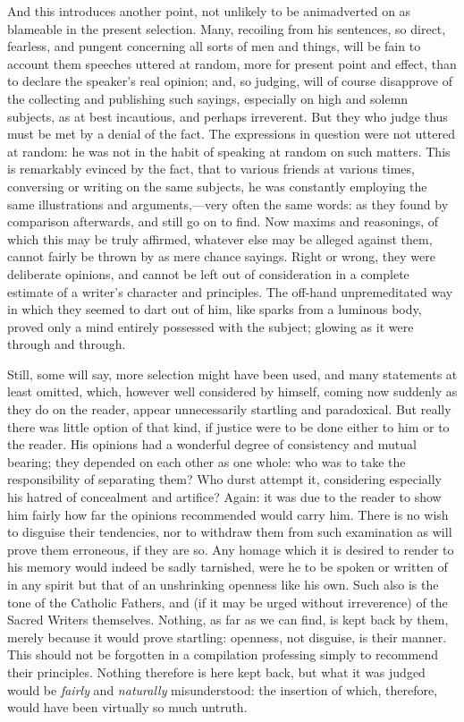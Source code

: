 And this introduces another
point, not unlikely to be animadverted on as blameable in the present
selection. Many, recoiling from his sentences, so direct, fearless,
and pungent concerning all sorts of men and things, will be fain to
account them speeches uttered at random, more for present point and
effect, than to declare the speaker's real opinion; and, so judging,
will of course disapprove of the collecting and publishing such
sayings, especially on high and solemn subjects, as at best
incautious, and perhaps irreverent. But they who judge thus must be
met by a denial of the fact. The expressions in question were not
uttered at random: he was not in the habit of speaking at random on
such matters. This is remarkably evinced by the fact, that to various
friends at various times, conversing or writing on the same subjects,
he was constantly employing \emph{}the same illustrations and
arguments,—very often the same words: as they found by comparison
afterwards, and still go on to find. Now maxims and reasonings, of
which this may be truly affirmed, whatever else may be alleged against
them, cannot fairly be thrown by as mere chance sayings. Right or
wrong, they were deliberate opinions, and cannot be left out of
consideration in a complete estimate of a writer's character and
principles. The off-hand unpremeditated way in which they seemed to
dart out of him, like sparks from a luminous body, proved only a mind
entirely possessed with the subject; glowing as it were through and
through.

Still, some will say, more
selection might have been used, and many statements at least omitted,
which, however well considered by himself, coming now suddenly as they
do on the reader, appear unnecessarily startling and paradoxical. But
really there was little option of that kind, if justice were to be
done either to him or to the reader. His opinions had a wonderful
degree of consistency and mutual bearing; they depended on each other
as one whole: who was to take the responsibility of separating them?
Who durst attempt it, considering especially his hatred of concealment
and artifice? Again: it was due to the reader to show him fairly
how far the opinions recommended would carry him. There is no wish to
disguise their tendencies, nor to withdraw them from such examination
as will prove them erroneous, if they are so. Any homage which it is
desired to render to his memory would indeed be sadly tarnished, were
he to be spoken or written of in any spirit but that of an unshrinking
openness like his own. Such also is the tone of the Catholic Fathers,
and (if it may be urged without irreverence) of the Sacred Writers
themselves. Nothing, as far as we can find, is kept back by them,
merely because it would prove startling: openness, not disguise, is
their manner. This should not be forgotten in a compilation professing
simply to recommend their principles. Nothing therefore is here kept
back, but what it was judged would be \emph{fairly} and \emph{naturally}
misunderstood: the insertion of which, therefore, would have been
virtually so much untruth.

